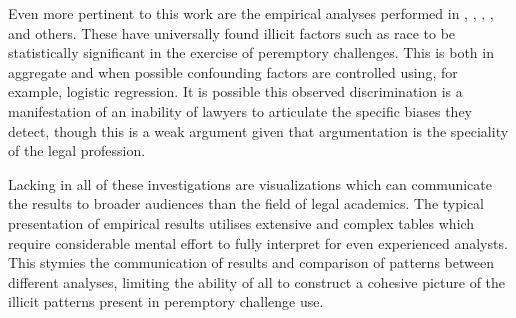 Even more pertinent to this work are the empirical analyses performed in \cite{PerempChalMurder}, \cite{JurySunshineProj},
\cite{StubbornLegacy}, \cite{baldus2012}, and others. These have
universally found illicit factors such as race to be statistically significant in
the exercise of peremptory challenges. This is both in aggregate and when possible confounding factors are controlled using, for example,
logistic regression. It is possible this observed discrimination is a manifestation of an inability of lawyers to
articulate the specific biases they detect, though this is a weak argument given that argumentation is the speciality of the legal profession.

Lacking in all of these investigations are visualizations which can communicate the results to broader audiences than the field of legal academics. The typical presentation of empirical results utilises extensive and complex tables which require considerable mental effort to fully interpret for even experienced analysts. This stymies the communication of results and comparison of patterns between different analyses, limiting the ability of all to construct a cohesive picture of the illicit patterns present in peremptory challenge use.
